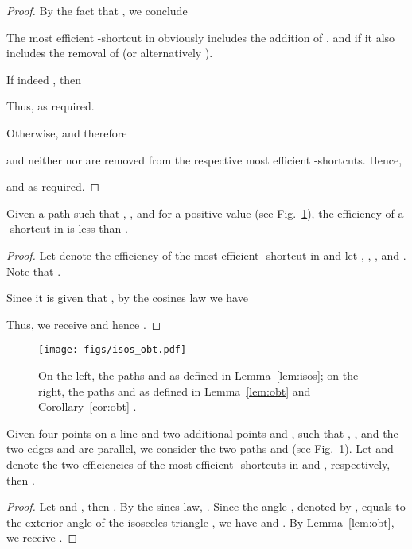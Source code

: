\documentclass[a4paper]{llncs}
\begin{document}
\begin{proof}
By the fact that , we conclude 

The most efficient -shortcut in  obviously includes the addition of , 
and if  it also includes the removal of  (or alternatively ). 

If indeed , then 

Thus,  as required. 

Otherwise,  and therefore 


and neither  nor  are removed from the respective most efficient -shortcuts. 
Hence, 

and  as required. 

\end{proof}






\begin{lemma}\label{lem:obt}
Given a path  such that , , and 
 for a positive value  (see Fig.~\ref{fig:isos_obt}), 
the efficiency of a -shortcut in  is less than .
\end{lemma}

\begin{proof}
Let  denote the efficiency of the most efficient -shortcut in  and let , , , and .
Note that .

Since it is given that ,
by the cosines law we have

Thus, we receive   
and hence .

\end{proof}
\begin{figure}[htb]
    \centering
        \texttt{[image: figs/isos\_obt.pdf]}
    \caption{On the left, the paths  and  as defined in Lemma~\ref{lem:isos};
    on the right, the paths  and  as defined in Lemma~\ref{lem:obt} and Corollary~\ref{cor:obt} .}
    \label{fig:isos_obt}
\end{figure}




\begin{corollary}\label{cor:obt}
Given four points  on a line and two additional points  and ,
such that , , and the two edges  and  are parallel,
we consider the two paths  and  (see Fig.~\ref{fig:isos_obt}). 
Let  and  denote the two efficiencies of the most efficient -shortcuts in  and , respectively, then .
\end{corollary}

\begin{proof}
Let  and , then .
By the sines law, .
Since the angle , denoted by , equals to the 
exterior angle of the isosceles triangle , we have
 and .
By Lemma~\ref{lem:obt}, we receive .
\end{proof}
\end{document}
